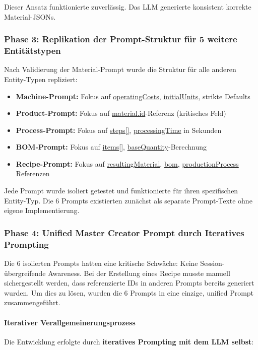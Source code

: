\noindent Dieser Ansatz funktionierte zuverlässig. Das LLM generierte konsistent korrekte Material-JSONs.

\subsubsection{Phase 3: Replikation der Prompt-Struktur für 5 weitere Entitätstypen}

Nach Validierung der Material-Prompt wurde die Struktur für alle anderen Entity-Typen repliziert:

\begin{itemize}
    \item \textbf{Machine-Prompt:} Fokus auf \url{operatingCosts}, \url{initialUnits}, strikte Defaults
    \item \textbf{Product-Prompt:} Fokus auf \url{material.id}-Referenz (kritisches Feld)
    \item \textbf{Process-Prompt:} Fokus auf \url{steps[]}, \url{processingTime} in Sekunden
    \item \textbf{BOM-Prompt:} Fokus auf \url{items[]}, \url{baseQuantity}-Berechnung
    \item \textbf{Recipe-Prompt:} Fokus auf \url{resultingMaterial}, \url{bom}, \url{productionProcess} Referenzen
\end{itemize}

\noindent Jede Prompt wurde isoliert getestet und funktionierte für ihren spezifischen Entity-Typ. Die 6 Prompts existierten zunächst als separate Prompt-Texte ohne eigene Implementierung.

\subsubsection{Phase 4: Unified Master Creator Prompt durch Iteratives Prompting}

Die 6 isolierten Prompts hatten eine kritische Schwäche: Keine Session-übergreifende Awareness. Bei der Erstellung eines Recipe musste manuell sichergestellt werden, dass referenzierte IDs in anderen Prompts bereits generiert wurden. Um dies zu lösen, wurden die 6 Prompts in eine einzige, unified Prompt zusammengeführt.

\paragraph{Iterativer Verallgemeinerungsprozess}

Die Entwicklung erfolgte durch \textbf{iteratives Prompting mit dem LLM selbst}:

